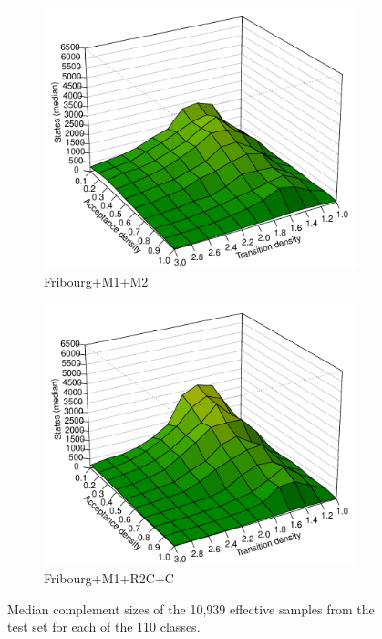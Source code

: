 \begin{figure}[ht]
  \hfill
  \begin{subfigure}[t]{\perspwidth\textwidth}
  \centering
  \includegraphics[width=\textwidth]{figures/r/internal/goal/s.median.Fribourg+M1+M2.pdf}
  \caption{Fribourg+M1+M2}
  \end{subfigure}
  \hfill
  \begin{subfigure}[t]{\perspwidth\textwidth}
  \centering
  \includegraphics[width=\textwidth]{figures/r/internal/goal/s.median.Fribourg+M1+R2C+C.pdf}
  \caption{Fribourg+M1+R2C+C}
  \end{subfigure}
  \hfill
\caption{Median complement sizes of the 10,939 effective samples from the \goal{} test set for each of the 110 classes.}
\label{i.g.persp_2}
\end{figure}

